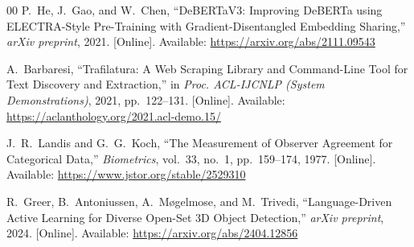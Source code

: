 \documentclass[conference]{IEEEtran}
\begin{document}
\begin{thebibliography}{00}
P.~He, J.~Gao, and W.~Chen,
``DeBERTaV3: Improving DeBERTa using ELECTRA-Style Pre-Training with Gradient-Disentangled Embedding Sharing,''
\textit{arXiv preprint}, 2021.
[Online]. Available: \url{https://arxiv.org/abs/2111.09543}

A.~Barbaresi,
``Trafilatura: A Web Scraping Library and Command-Line Tool for Text Discovery and Extraction,''
in \textit{Proc. ACL-IJCNLP (System Demonstrations)}, 2021, pp.~122--131.
[Online]. Available: \url{https://aclanthology.org/2021.acl-demo.15/}

J.~R.~Landis and G.~G.~Koch,
``The Measurement of Observer Agreement for Categorical Data,''
\textit{Biometrics}, vol.~33, no.~1, pp.~159--174, 1977.
[Online]. Available: \url{https://www.jstor.org/stable/2529310}

R.~Greer, B.~Antoniussen, A.~M{\o}gelmose, and M.~Trivedi,
``Language-Driven Active Learning for Diverse Open-Set 3D Object Detection,''
\textit{arXiv preprint}, 2024.
[Online]. Available: \url{https://arxiv.org/abs/2404.12856}

\end{thebibliography}
\end{document}
